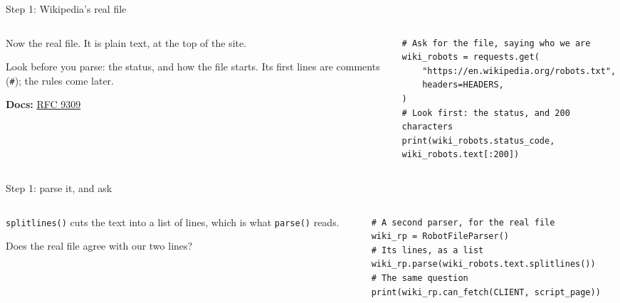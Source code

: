 \documentclass[9pt,aspectratio=169]{beamer}
\begin{document}
\begin{frame}[fragile]{Step 1: Wikipedia's real file}
    \begin{columns}[T]
        \begin{column}{0.37\textwidth}
            Now the real file. It is plain text, at the top of the site.

            \medskip
            Look before you parse: the status, and how the file starts. Its first lines are comments (\texttt{\#}); the rules come later.

            \medskip
            {\scriptsize\textbf{Docs:} \href{https://www.rfc-editor.org/rfc/rfc9309.html}{RFC 9309}\par}
        \end{column}
        \begin{column}{0.6\textwidth}
\begin{lstlisting}
# Ask for the file, saying who we are
wiki_robots = requests.get(
    "https://en.wikipedia.org/robots.txt",
    headers=HEADERS,
)
# Look first: the status, and 200 characters
print(wiki_robots.status_code, wiki_robots.text[:200])
\end{lstlisting}
        \end{column}
    \end{columns}
\end{frame}

\begin{frame}[fragile]{Step 1: parse it, and ask}
    \begin{columns}[T]
        \begin{column}{0.37\textwidth}
            \texttt{splitlines()} cuts the text into a list of lines, which is what \texttt{parse()} reads.

            \medskip
            Does the real file agree with our two lines?
        \end{column}
        \begin{column}{0.6\textwidth}
\begin{lstlisting}
# A second parser, for the real file
wiki_rp = RobotFileParser()
# Its lines, as a list
wiki_rp.parse(wiki_robots.text.splitlines())
# The same question
print(wiki_rp.can_fetch(CLIENT, script_page))
\end{lstlisting}
        \end{column}
    \end{columns}
\end{frame}
\end{document}
